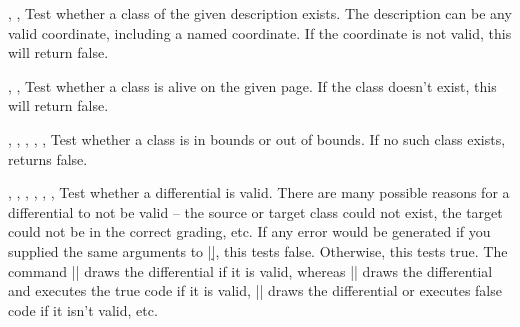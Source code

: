 \begin{sseqdata}[name = basic, cohomological Serre grading]
\begin{commandlist}{
    \IfExistsTF{},
    \IfExistsT{},
    \IfExistsF{}
}
Test whether a class of the given description exists. The description can be any valid coordinate, including a named coordinate. If the coordinate is not valid, this will return false.
\end{commandlist}

\begin{commandlist}{
    \IfAliveTF{},
    \IfAliveT{},
    \IfAliveF{}
}
Test whether a class is alive on the given page. If the class doesn't exist, this will return false.
\end{commandlist}

\begin{commandlist}{
    \IfOutOfBoundsTF{},
    \IfOutOfBoundsT{},
    \IfOutOfBoundsF{},
    \IfInBoundsTF{},
    \IfInBoundsT{},
    \IfInBoundsF{}
}
Test whether a class is in bounds or out of bounds. If no such class exists, returns false.
\end{commandlist}

\begin{commandlist}{
    \IfValidDifferentialTF{},
    \IfValidDifferentialT{},
    \IfValidDifferentialF{},
    \DrawIfValidDifferentialTF\ooptions{},
    \DrawIfValidDifferentialT\ooptions{},
    \DrawIfValidDifferentialF\ooptions{},
    \DrawIfValidDifferential\ooptions{}
}
Test whether a differential is valid. There are many possible reasons for a differential to not be valid -- the source or target class could not exist, the target could not be in the correct grading, etc. If any error would be generated if you supplied the same arguments to |\d|, this tests false. Otherwise, this tests true. The command |\DrawIfValidDifferental| draws the differential if it is valid, whereas |\DrawIfValidDifferentalT| draws the differential and executes the true code if it is valid,
|\DrawIfValidDifferentalF| draws the differential or executes false code if it isn't valid, etc.
\end{commandlist}




\end{sseqdata}
